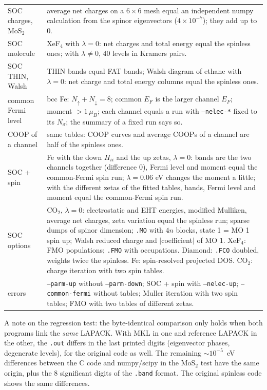 \documentclass[11pt,a4paper]{article}
\newcommand{\opt}[1]{\texttt{#1}}
\begin{document}
\begin{longtable}{p{4.2cm} p{10.6cm}}
SOC charges, MoS$_2$ & average net charges on a $6\times6$ mesh equal an independent numpy
calculation from the spinor eigenvectors ($4\times10^{-7}$); they add up to 0. \\
SOC molecule & XeF$_4$ with $\lambda=0$: net charges and total energy equal the spinless
ones; with $\lambda\ne0$, 40 levels in Kramers pairs. \\
SOC THIN, Walsh & THIN bands equal FAT bands; Walsh diagram of ethane with $\lambda=0$:
net charge and total energy columns equal the spinless ones. \\
common Fermi level & bcc Fe: $N_\uparrow+N_\downarrow=8$; common $E_F$ is the larger
channel $E_F$; moment $>1\,\mu_B$; each channel equals a run with \opt{--nelec-*} fixed to
its $N_\sigma$; the summary of a fixed run says so. \\
COOP of a channel & same tables: COOP curves and average COOPs of a channel are half of
the spinless ones. \\
SOC + spin & Fe with the down $H_{ii}$ and the up zetas, $\lambda=0$: bands are the two
channels together (difference 0), Fermi level and moment equal the common-Fermi spin run;
$\lambda=0.06$ eV changes the moment a little; with the different zetas of the fitted
tables, bands, Fermi level and moment equal the common-Fermi spin run. \\
SOC options & CO$_2$, $\lambda=0$: electrostatic and EHT energies, modified Mulliken, average
net charges, zeta variation equal the spinless run; sparse dumps of spinor dimension;
\texttt{.MO} with $4n$ blocks, state 1 = MO 1 spin up; Walsh reduced charge and
$|$coefficient$|$ of MO 1. XeF$_4$: FMO populations; \texttt{.FMO} with occupations. Diamond:
\texttt{.FCO} doubled, weights twice the spinless. Fe: spin-resolved projected DOS. CO$_2$:
charge iteration with two spin tables. \\
errors & \opt{--parm-up} without \opt{--parm-down}; SOC + spin with \opt{--nelec-up};
\opt{--common-fermi} without tables; Muller iteration with two spin tables; FMO with two
tables of different zetas. \\
\bottomrule
\end{longtable}

A note on the regression test: the byte-identical comparison only holds when both programs
link the \emph{same} LAPACK. With MKL in one and reference LAPACK in the other, the
\texttt{.out} differs in the last printed digits (eigenvector phases, degenerate levels),
for the original code as well. The remaining $\sim10^{-5}$~eV differences between the C
code and numpy/scipy in the MoS$_2$ test have the same origin, plus the 8 significant
digits of the \texttt{.band} format. The original spinless code shows the same differences.
\end{document}
